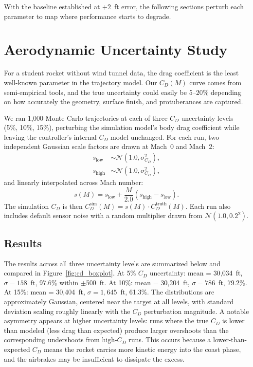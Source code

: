 \documentclass[11pt,letterpaper]{article}
\newcommand{\Cd}{C_D}
\begin{document}
With the baseline established at $+2$~ft error, the following sections perturb each parameter to map where performance starts to degrade.


\section{Aerodynamic Uncertainty Study}
\label{sec:aero_uncertainty}

For a student rocket without wind tunnel data, the drag coefficient is the least well-known parameter in the trajectory model. Our $\Cd(M)$ curve comes from semi-empirical tools, and the true uncertainty could easily be 5--20\% depending on how accurately the geometry, surface finish, and protuberances are captured.

We ran 1{,}000 Monte Carlo trajectories at each of three $\Cd$ uncertainty levels (5\%, 10\%, 15\%), perturbing the simulation model's body drag coefficient while leaving the controller's internal $\Cd$ model unchanged. For each run, two independent Gaussian scale factors are drawn at Mach~0 and Mach~2:
\begin{align}
    s_{\mathrm{low}} &\sim \mathcal{N}(1.0, \sigma_{\Cd}^2), \label{eq:cd_scale_low} \\
    s_{\mathrm{high}} &\sim \mathcal{N}(1.0, \sigma_{\Cd}^2), \label{eq:cd_scale_high}
\end{align}
and linearly interpolated across Mach number:
\begin{equation}
    s(M) = s_{\mathrm{low}} + \frac{M}{2.0} (s_{\mathrm{high}} - s_{\mathrm{low}}).
    \label{eq:cd_scale_interp}
\end{equation}
The simulation $\Cd$ is then $\Cd^{\mathrm{sim}}(M) = s(M) \cdot \Cd^{\mathrm{truth}}(M)$. Each run also includes default sensor noise with a random multiplier drawn from $\mathcal{N}(1.0, 0.2^2)$.

\subsection{Results}
\label{sec:aero_results}

The results across all three uncertainty levels are summarized below and compared in Figure~\ref{fig:cd_boxplot}. At 5\% $\Cd$ uncertainty: mean = 30{,}034~ft, $\sigma = 158$~ft, 97.6\% within $\pm$500~ft. At 10\%: mean = 30{,}204~ft, $\sigma = 786$~ft, 79.2\%. At 15\%: mean = 30{,}404~ft, $\sigma = 1{,}645$~ft, 61.3\%. The distributions are approximately Gaussian, centered near the target at all levels, with standard deviation scaling roughly linearly with the $\Cd$ perturbation magnitude. A notable asymmetry appears at higher uncertainty levels: runs where the true $\Cd$ is lower than modeled (less drag than expected) produce larger overshoots than the corresponding undershoots from high-$\Cd$ runs. This occurs because a lower-than-expected $\Cd$ means the rocket carries more kinetic energy into the coast phase, and the airbrakes may be insufficient to dissipate the excess.
\end{document}
